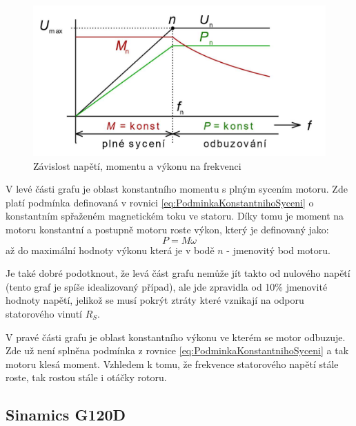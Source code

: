 \begin{figure}[hptb]
	\centering
	\includegraphics[width=1\linewidth]{images/ProvozniRezimyAMSFrekvencnimMenicem}
	\caption{Závislost napětí, momentu a výkonu na frekvenci \cite{SkriptaRizeniOtacekAM}}
	\label{fig:provoznirezimyamsfrekvencnimmenicem}
\end{figure}

V levé části grafu je oblast konstantního momentu s plným sycením motoru. Zde platí podmínka definovaná v rovnici \ref{eq:PodminkaKonstantnihoSyceni} o konstantním spřaženém magnetickém toku ve statoru. Díky tomu je moment na motoru konstantní a postupně motoru roste výkon, který je definovaný jako:
\begin{equation}
	P = M\omega
	\label{eq:vykonmotoru}
\end{equation}
až do maximální hodnoty výkonu která je v bodě $n$ - jmenovitý bod motoru.

Je také dobré podotknout, že levá část grafu nemůže jít takto od nulového napětí (tento graf je spíše idealizovaný případ), ale jde zpravidla od 10\% jmenovité hodnoty napětí, jelikož se musí pokrýt ztráty které vznikají na odporu statorového vinutí $R_S$. \cite{SkriptaRizeniOtacekAM}

V pravé části grafu je oblast konstantního výkonu ve kterém se motor odbuzuje. Zde už není splněna podmínka z rovnice \ref{eq:PodminkaKonstantnihoSyceni} a tak motoru klesá moment. Vzhledem k tomu, že frekvence statorového napětí stále roste, tak rostou stále i otáčky rotoru.

\subsection{Sinamics G120D}

